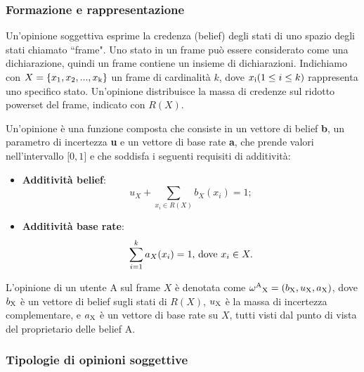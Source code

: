 \documentclass{report}
\begin{document}
	\hypertarget{header-n50}{%
		\subsubsection{Formazione e rappresentazione}\label{header-n50}}
	
	Un'opinione soggettiva esprime la credenza (belief) degli stati di uno
	spazio degli stati chiamato ``frame". Uno stato in un frame può essere
	considerato come una dichiarazione, quindi un frame contiene un insieme
	di dichiarazioni. Indichiamo con $X = \{x\textsubscript{1}, x\textsubscript{2}, ... , x\textsubscript{k}\}$ un frame di
	cardinalità $k$, dove $x\textsubscript{i} (1\le i \le k)$ rappresenta uno
	specifico stato. Un'opinione distribuisce la massa di credenze sul
	ridotto powerset del frame, indicato con $R(X)$.
	
	Un'opinione è una funzione composta che consiste in un vettore di belief
	\textbf{b}, un parametro di incertezza \textbf{u} e un vettore di base
	rate \textbf{a}, che prende valori nell'intervallo ${[}0,1{]}$ e che
	soddisfa i seguenti requisiti di additività:
	
	\begin{itemize}
		\item
		\textbf{Additività belief}: \begin{equation} u_X +\sum_{x_i \in R(X)}b_X(x_i)=1 \label{equazione1};\end{equation}
		\item
		\textbf{Additività base rate}: \begin{equation}\sum_{i=1}^k a_X(x_i)=1 \textnormal{, dove } x_i \in X \label{equazione2}.\end{equation}
	\end{itemize}
	
	L'opinione di un utente A sul frame $X$ è denotata come $\omega \textsuperscript{A}\textsubscript{X} =
	(b\textsubscript{X},u\textsubscript{X},a\textsubscript{X})$, dove $b\textsubscript{X}$ è un vettore di belief sugli stati di $R(X)$,
	$u\textsubscript{X}$ è la massa di incertezza complementare, e $a\textsubscript{X}$ è un vettore di base
	rate su $X$, tutti visti dal punto di vista del proprietario delle belief
	A.
	
	\hypertarget{header-n64}{%
		\subsubsection{Tipologie di opinioni soggettive}\label{header-n64}}
	
\end{document}
